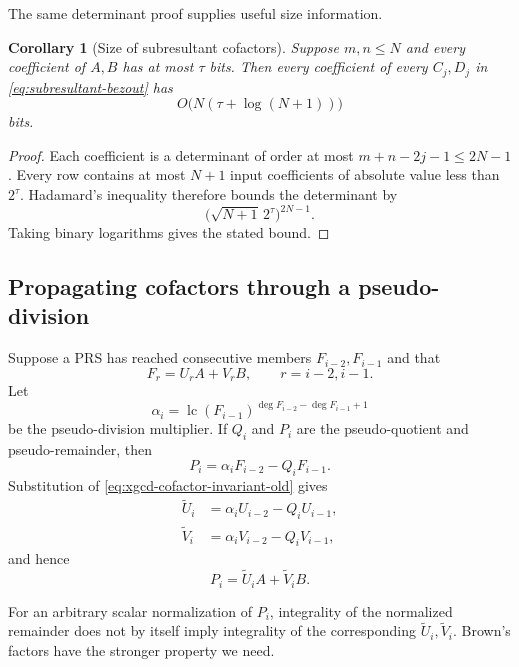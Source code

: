 \documentclass[11pt]{book}
\newtheorem{corollary}[theorem]{Corollary}
\theoremstyle{definition}
\begin{document}
The same determinant proof supplies useful size information.

\begin{corollary}[Size of subresultant cofactors]
\label{cor:subresultant-cofactor-size}
Suppose $m,n\le N$ and every coefficient of $A,B$ has at most $\tau$ bits.
Then every coefficient of every $C_j,D_j$ in
\eqref{eq:subresultant-bezout} has
\begin{equation}\label{eq:subresultant-cofactor-bits}
 O\bigl(N(\tau+\log(N+1))\bigr)
\end{equation}
bits.
\end{corollary}

\begin{proof}
Each coefficient is a determinant of order at most $m+n-2j-1\le2N-1$.
Every row contains at most $N+1$ input coefficients of absolute value less
than $2^\tau$.  Hadamard's inequality therefore bounds the determinant by
\[
 \bigl(\sqrt{N+1}\,2^\tau\bigr)^{2N-1}.
\]
Taking binary logarithms gives the stated bound.
\end{proof}

\subsection{Propagating cofactors through a pseudo-division}

Suppose a PRS has reached consecutive members $F_{i-2},F_{i-1}$ and that
\begin{equation}\label{eq:xgcd-cofactor-invariant-old}
 F_r=U_rA+V_rB,
 \qquad r=i-2,i-1.
\end{equation}
Let
\[
 \alpha_i=\operatorname{lc}(F_{i-1})^{\deg F_{i-2}-\deg F_{i-1}+1}
\]
be the pseudo-division multiplier.  If $Q_i$ and $P_i$ are the
pseudo-quotient and pseudo-remainder, then
\begin{equation}\label{eq:xgcd-pseudodiv}
 P_i=\alpha_iF_{i-2}-Q_iF_{i-1}.
\end{equation}
Substitution of \eqref{eq:xgcd-cofactor-invariant-old} gives
\begin{align}
 \widetilde U_i&=\alpha_iU_{i-2}-Q_iU_{i-1},
 \label{eq:xgcd-raw-u}\\
 \widetilde V_i&=\alpha_iV_{i-2}-Q_iV_{i-1},
 \label{eq:xgcd-raw-v}
\end{align}
and hence
\begin{equation}\label{eq:xgcd-raw-certificate}
 P_i=\widetilde U_iA+\widetilde V_iB.
\end{equation}

For an arbitrary scalar normalization of $P_i$, integrality of the normalized
remainder does not by itself imply integrality of the corresponding
$\widetilde U_i,\widetilde V_i$.  Brown's factors have the stronger property
we need.
\end{document}

